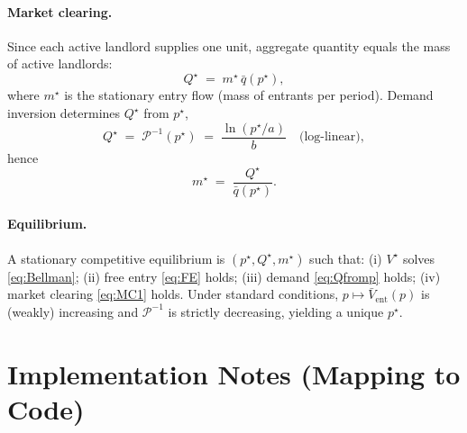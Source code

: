 \documentclass[11pt]{article}
\begin{document}
\paragraph{Market clearing.} Since each active landlord supplies one unit, aggregate quantity equals the mass of active landlords:
\begin{equation}
Q^\star \;=\; m^\star\,\bar q(p^\star),
\label{eq:MC1}
\end{equation}
where $m^\star$ is the stationary entry flow (mass of entrants per period). Demand inversion determines $Q^\star$ from $p^\star$,
\begin{equation}
Q^\star \;=\; \mathcal{P}^{-1}(p^\star)
\;=\; \frac{\ln(p^\star/a)}{b}\quad\text{(log-linear)},
\label{eq:Qfromp}
\end{equation}
hence
\begin{equation}
m^\star \;=\; \frac{Q^\star}{\bar q(p^\star)}.
\label{eq:mfromQqbar}
\end{equation}

\paragraph{Equilibrium.}
A stationary competitive equilibrium is $(p^\star,Q^\star,m^\star)$ such that:
(i) $V^\star$ solves \eqref{eq:Bellman}; (ii) free entry \eqref{eq:FE} holds;
(iii) demand \eqref{eq:Qfromp} holds; (iv) market clearing \eqref{eq:MC1} holds.
Under standard conditions, $p\mapsto \bar V_{\text{ent}}(p)$ is (weakly) increasing and $\mathcal{P}^{-1}$ is strictly decreasing, yielding a unique $p^\star$.

\section{Implementation Notes (Mapping to Code)}
\end{document}
